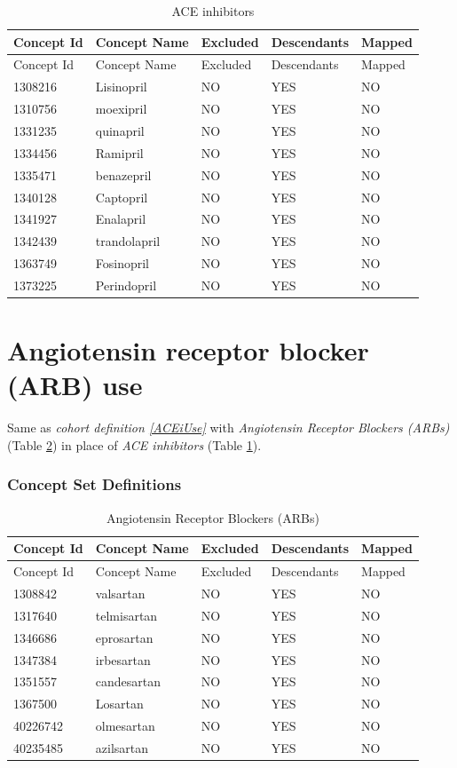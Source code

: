 \documentclass[11pt]{book}
\theoremstyle{definition}
\theoremstyle{definition}
\theoremstyle{definition}
\theoremstyle{remark}
\begin{document}
\begin{longtable}[]{@{}lllll@{}}
\caption{\label{tab:ACEiUseACE} ACE inhibitors}\tabularnewline
\toprule
Concept Id & Concept Name & Excluded & Descendants & Mapped\tabularnewline
\midrule
\endfirsthead
\toprule
Concept Id & Concept Name & Excluded & Descendants & Mapped\tabularnewline
\midrule
\endhead
1308216 & Lisinopril & NO & YES & NO\tabularnewline
1310756 & moexipril & NO & YES & NO\tabularnewline
1331235 & quinapril & NO & YES & NO\tabularnewline
1334456 & Ramipril & NO & YES & NO\tabularnewline
1335471 & benazepril & NO & YES & NO\tabularnewline
1340128 & Captopril & NO & YES & NO\tabularnewline
1341927 & Enalapril & NO & YES & NO\tabularnewline
1342439 & trandolapril & NO & YES & NO\tabularnewline
1363749 & Fosinopril & NO & YES & NO\tabularnewline
1373225 & Perindopril & NO & YES & NO\tabularnewline
\bottomrule
\end{longtable}

\hypertarget{ARBUse}{%
\section{Angiotensin receptor blocker (ARB) use}\label{ARBUse}}

Same as \emph{cohort definition \ref{ACEiUse}} with \emph{Angiotensin Receptor Blockers (ARBs)} (Table \ref{tab:ARBUseARBs}) in place of \emph{ACE inhibitors} (Table \ref{tab:ACEiUseACE}).

\hypertarget{concept-set-definitions-7}{%
\subsubsection*{Concept Set Definitions}\label{concept-set-definitions-7}}

\begin{longtable}[]{@{}lllll@{}}
\caption{\label{tab:ARBUseARBs} Angiotensin Receptor Blockers (ARBs)}\tabularnewline
\toprule
Concept Id & Concept Name & Excluded & Descendants & Mapped\tabularnewline
\midrule
\endfirsthead
\toprule
Concept Id & Concept Name & Excluded & Descendants & Mapped\tabularnewline
\midrule
\endhead
1308842 & valsartan & NO & YES & NO\tabularnewline
1317640 & telmisartan & NO & YES & NO\tabularnewline
1346686 & eprosartan & NO & YES & NO\tabularnewline
1347384 & irbesartan & NO & YES & NO\tabularnewline
1351557 & candesartan & NO & YES & NO\tabularnewline
1367500 & Losartan & NO & YES & NO\tabularnewline
40226742 & olmesartan & NO & YES & NO\tabularnewline
40235485 & azilsartan & NO & YES & NO\tabularnewline
\bottomrule
\end{longtable}
\end{document}
